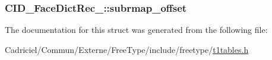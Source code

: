 \hypertarget{struct_c_i_d___face_dict_rec___a45d58111727af70018289e7c5b64ba8c}{
\subsubsection[{subrmap\-\_\-offset}]{ C\-I\-D\-\_\-\-Face\-Dict\-Rec\-\_\-\-::subrmap\-\_\-offset}}\label{struct_c_i_d___face_dict_rec___a45d58111727af70018289e7c5b64ba8c}


The documentation for this struct was generated from the following file\-:\begin{DoxyCompactItemize}
\item 
Cadriciel/\-Commun/\-Externe/\-Free\-Type/include/freetype/\hyperlink{t1tables_8h}{t1tables.\-h}\end{DoxyCompactItemize}

